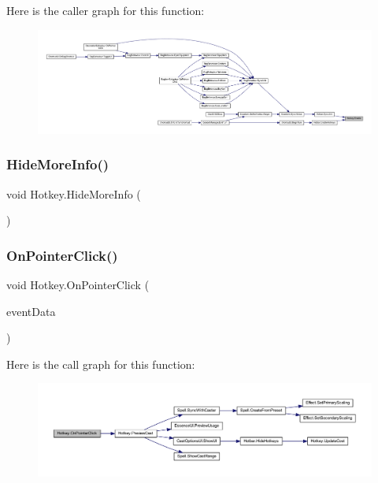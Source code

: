 Here is the caller graph for this function\+:
\nopagebreak
\begin{figure}[H]
\begin{center}
\leavevmode
\includegraphics[width=350pt]{class_hotkey_ae078d4716dbd3a3c703a3ef341e56562_icgraph}
\end{center}
\end{figure}
\mbox{\label{class_hotkey_a9362ee088eb695642f30c3b8818d0b1a}} 
\subsubsection{\texorpdfstring{HideMoreInfo()}{HideMoreInfo()}}
{\footnotesize\ttfamily void Hotkey.\+Hide\+More\+Info (\begin{DoxyParamCaption}{ }\end{DoxyParamCaption})}

\mbox{\label{class_hotkey_a86ced9a614ad8d537fcab4738abcb0ef}} 
\subsubsection{\texorpdfstring{OnPointerClick()}{OnPointerClick()}}
{\footnotesize\ttfamily void Hotkey.\+On\+Pointer\+Click (\begin{DoxyParamCaption}\item[{Pointer\+Event\+Data}]{event\+Data }\end{DoxyParamCaption})}

Here is the call graph for this function\+:
\nopagebreak
\begin{figure}[H]
\begin{center}
\leavevmode
\includegraphics[width=350pt]{class_hotkey_a86ced9a614ad8d537fcab4738abcb0ef_cgraph}
\end{center}
\end{figure}
\mbox{\label{class_hotkey_a209f6726592cf69b7e21bd68ced48cb3}} 

